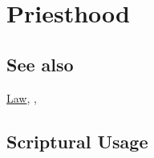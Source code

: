 \section{Priesthood}
	\label{PRIESTHOOD}
	
\subsection{See also}

	\hyperref[LAW]{Law}, \hyperref[HUPOTASSO]{}, 





\subsection{Scriptural Usage} %
	\label{PRIESTHOOD-SCRIPTURES}

	
	
